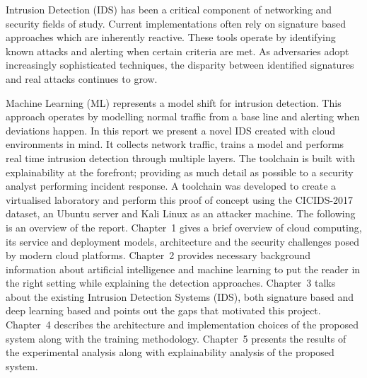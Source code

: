 \documentclass[12pt, a4paper, oneside]{report}
\begin{document}
Intrusion Detection (IDS) has been a critical component of networking and security fields of study. Current implementations often rely on signature based approaches which are inherently reactive. These tools operate by identifying known attacks and alerting when certain criteria are met. As adversaries adopt increasingly sophisticated techniques, the disparity between identified signatures and real attacks continues to grow.

Machine Learning (ML) represents a model shift for intrusion detection. This approach operates by modelling normal traffic from a base line and alerting when deviations happen. In this report we present a novel IDS created with cloud environments in mind. It collects network traffic, trains a model and performs real time intrusion detection through multiple layers. The toolchain is built with explainability at the forefront; providing as much detail as possible to a security analyst performing incident response. A toolchain was developed to create a virtualised laboratory and perform this proof of concept using the CICIDS-2017 dataset, an Ubuntu server and Kali Linux as an attacker machine.
The following is an overview of the report. 
Chapter~1 gives a brief overview of cloud computing, its service and deployment models, architecture and the security challenges posed by modern cloud platforms. 
Chapter~2 provides necessary background information about artificial intelligence and machine learning to put the reader in the right setting while explaining the detection approaches. 
Chapter~3 talks about the existing Intrusion Detection Systems (IDS), both signature based and deep learning based and points out the gaps that motivated this project. 
Chapter~4 describes the architecture and implementation choices of the proposed system along with the training methodology. 
Chapter~5 presents the results of the experimental analysis along with explainability analysis of the proposed system.


\newpage


  
  







\appendix

\newpage

\end{document}

